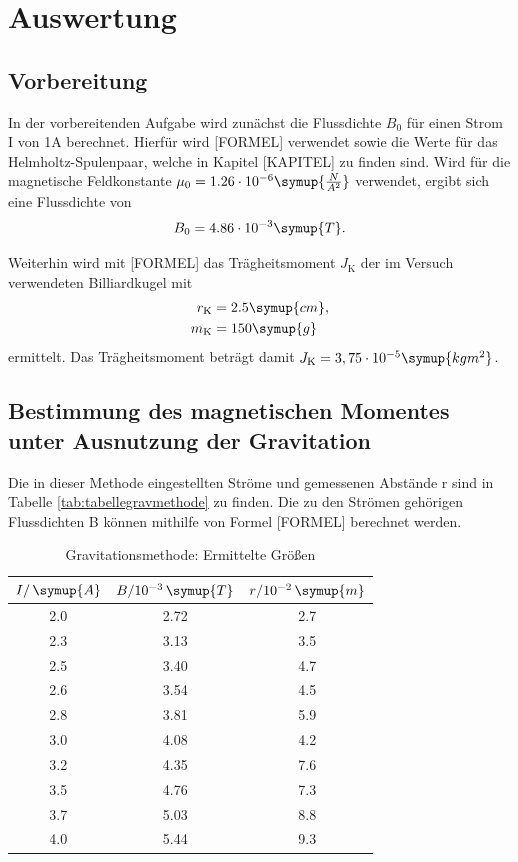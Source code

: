 \section{Auswertung}
\subsection{Vorbereitung}
In der vorbereitenden Aufgabe wird zunächst die Flussdichte $B_0$ für einen Strom I von 1A berechnet. Hierfür wird [FORMEL] verwendet
sowie die Werte für das Helmholtz-Spulenpaar, welche in Kapitel [KAPITEL] zu finden sind.
Wird für die magnetische Feldkonstante $\mu_0 = 1.26 \cdot 10^{-6} \symup{\frac{N}{A^2}}$ verwendet, ergibt sich eine Flussdichte
von 
\begin{equation*}
B_0 = 4.86\cdot 10^{-3} \symup{T}.
\end{equation*}

Weiterhin wird mit [FORMEL] das Trägheitsmoment $J_{\text{K}}$ der im Versuch verwendeten Billiardkugel mit 
\begin{equation*}
\begin{aligned}
r_{\text{K}} &= 2.5\symup{cm}, \\
m_{\text{K}} &= 150\symup{g}
\end{aligned}
\end{equation*}
ermittelt. Das Trägheitsmoment beträgt damit $J_{\text{K}} = 3,75 \cdot 10^{-5} \symup{kg m^2}$.


\subsection{Bestimmung des magnetischen Momentes unter Ausnutzung der Gravitation}
Die in dieser Methode eingestellten Ströme und gemessenen Abstände r sind in Tabelle \eqref{tab:tabellegravmethode} zu finden. Die zu 
den Strömen gehörigen Flussdichten B können mithilfe von Formel [FORMEL] berechnet werden.

\begin{table}[htbp]
\centering
\caption{Gravitationsmethode: Ermittelte Größen}
\label{tab:tabellegravmethode}
\begin{tabular}{S[table-format=1.1] S[table-format=2.2] S[table-format=1.1]}
\toprule
 {$I/\, \symup{A}$} & {$B/10^{-3}\, \symup{T}$} & {$r/10^{-2}\, \symup{m}$} \\
 &  2.72 & 2.7 \\
2.3 &  3.13 & 3.5 \\
2.5 &  3.40 & 4.7 \\
2.6 &  3.54 & 4.5 \\
2.8 &  3.81 & 5.9 \\
3.0 &  4.08 & 4.2 \\
3.2 &  4.35 & 7.6 \\
3.5 &  4.76 & 7.3 \\
3.7 &  5.03 & 8.8 \\
4.0 &  5.44 & 9.3 \\

\bottomrule
\end{tabular}
\end{table}

